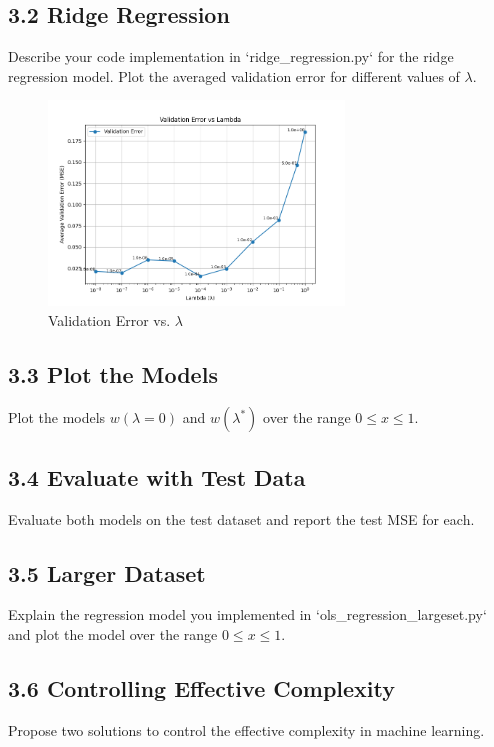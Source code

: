 \documentclass[12pt]{article}
\begin{document}
\subsection*{3.2 Ridge Regression}
Describe your code implementation in `ridge\_regression.py` for the ridge regression model. Plot the averaged validation error for different values of \( \lambda \).

\begin{figure}[H]
    \centering
    \includegraphics[width=0.7\textwidth]{ridge_regression_plot.png}
    \caption{Validation Error vs. \( \lambda \)}
\end{figure}

\subsection*{3.3 Plot the Models}
Plot the models \( w(\lambda = 0) \) and \( w(\lambda^*) \) over the range \( 0 \leq x \leq 1 \).

\subsection*{3.4 Evaluate with Test Data}
Evaluate both models on the test dataset and report the test MSE for each.

\subsection*{3.5 Larger Dataset}
Explain the regression model you implemented in `ols\_regression\_largeset.py` and plot the model over the range \( 0 \leq x \leq 1 \).

\subsection*{3.6 Controlling Effective Complexity}
Propose two solutions to control the effective complexity in machine learning.
\end{document}
